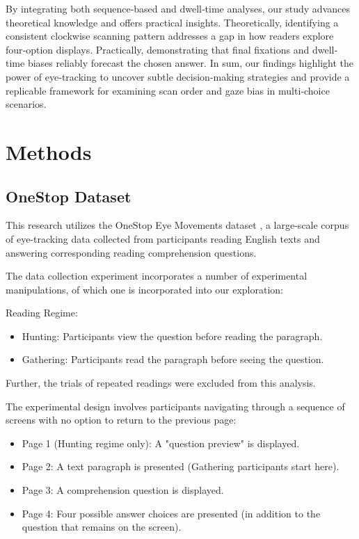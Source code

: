 \documentclass[manuscript,review,anonymous]{acmart}
\begin{document}
    By integrating both sequence‐based and dwell‐time analyses, our study advances theoretical knowledge and offers practical insights. Theoretically, identifying a consistent clockwise scanning pattern addresses a gap in how readers explore four‐option displays. Practically, demonstrating that final fixations and dwell‐time biases reliably forecast the chosen answer. In sum, our findings highlight the power of eye‐tracking to uncover subtle decision‐making strategies and provide a replicable framework for examining scan order and gaze bias in multi‐choice scenarios.



\section{Methods}
    \subsection{OneStop Dataset}
    This research utilizes the OneStop Eye Movements dataset  \cite{berzak2025onestop}, a large-scale corpus of eye-tracking data collected from participants reading English texts and answering corresponding reading comprehension questions.

    The data collection experiment incorporates a number of experimental manipulations, of which one is incorporated into our exploration:

    Reading Regime:
    \begin{itemize}
        \item Hunting: Participants view the question before reading the paragraph.
        \item Gathering: Participants read the paragraph before seeing the question.
    \end{itemize}

    Further, the trials of repeated readings were excluded from this analysis.
    \newline
    
    The experimental design involves participants navigating through a sequence of screens with no option to return to the previous page:
    \begin{itemize}
        \item Page 1 (Hunting regime only): A "question preview" is displayed.
        \item Page 2: A text paragraph is presented (Gathering participants start here).
        \item Page 3: A comprehension question is displayed.
        \item Page 4: Four possible answer choices are presented (in addition to the question that remains on the screen).
    \end{itemize}
\end{document}

